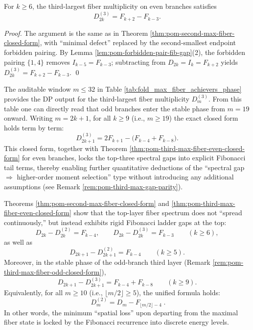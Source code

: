 \begin{theorem}\label{thm:pom-third-max-fiber-even-closed-form}
For \(k\ge 6\), the third-largest fiber multiplicity on even branches satisfies
\[
D_{2k}^{(3)}=F_{k+2}-F_{k-3}.
\]
\end{theorem}
\begin{proof}
The argument is the same as in Theorem \ref{thm:pom-second-max-fiber-closed-form}, with ``minimal defect'' replaced by the second-smallest endpoint forbidden pairing. By Lemma \ref{lem:pom-forbidden-pair-fib-gap}(2), the forbidden pairing \(\{1,4\}\) removes \(I_{k-5}=F_{k-3}\); subtracting from \(D_{2k}=I_k=F_{k+2}\) yields \(D_{2k}^{(3)}=F_{k+2}-F_{k-3}\). \qed
\end{proof}

\begin{remark}\label{rem:pom-third-max-fiber-odd-closed-form}
The auditable window \(m\le 32\) in Table \ref{tab:fold_max_fiber_achievers_phase} provides the DP output for the third-largest fiber multiplicity \(D_m^{(3)}\).
From this table one can directly read that odd branches enter the stable phase from \(m=19\) onward.
Writing \(m=2k+1\), for all \(k\ge 9\) (i.e., \(m\ge 19\)) the exact closed form holds term by term:
\[
\boxed{\;
D_{2k+1}^{(3)}=2F_{k+1}-\bigl(F_{k-4}+F_{k-8}\bigr).\;}
\]
This closed form, together with Theorem \ref{thm:pom-third-max-fiber-even-closed-form} for even branches, locks the top-three spectral gaps into explicit Fibonacci tail terms, thereby enabling further quantitative deductions of the ``spectral gap \(\Rightarrow\) higher-order moment selection'' type without introducing any additional assumptions (see Remark \ref{rem:pom-third-max-gap-parity}).
\end{remark}

\begin{remark}\label{rem:pom-top-fiber-spectrum-ladder}
Theorems \ref{thm:pom-second-max-fiber-closed-form} and \ref{thm:pom-third-max-fiber-even-closed-form} show that the top-layer fiber spectrum does not ``spread continuously,'' but instead exhibits rigid Fibonacci ladder gaps at the top:
\[
D_{2k}-D_{2k}^{(2)}=F_{k-4},\qquad
D_{2k}-D_{2k}^{(3)}=F_{k-3}\qquad(k\ge 6),
\]
as well as
\[
D_{2k+1}-D_{2k+1}^{(2)}=F_{k-4}\qquad(k\ge 5).
\]
Moreover, in the stable phase of the odd-branch third layer (Remark \ref{rem:pom-third-max-fiber-odd-closed-form}),
\[
D_{2k+1}-D_{2k+1}^{(3)}=F_{k-4}+F_{k-8}\qquad(k\ge 9).
\]
Equivalently, for all \(m\ge 10\) (i.e., \(\lfloor m/2\rfloor\ge 5\)), the unified formula holds:
\[
\boxed{\;
D_m^{(2)}=D_m-F_{\lfloor m/2\rfloor-4}\; }.
\]
In other words, the minimum ``spatial loss'' upon departing from the maximal fiber state is locked by the Fibonacci recurrence into discrete energy levels.
\end{remark}


